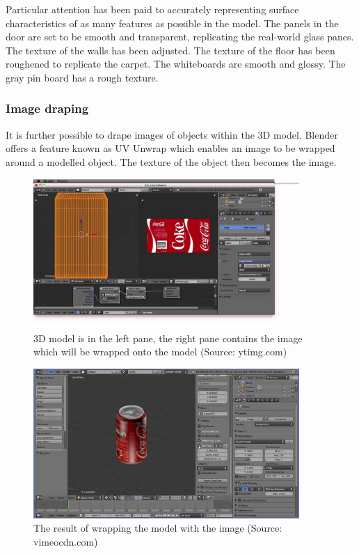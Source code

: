 \documentclass[11pt,a4paper]{report}
\begin{document}
				Particular attention has been paid to accurately representing surface characteristics of as many features as possible in the model.
				The panels in the door are set to be smooth and transparent, replicating the real-world glass panes. 
				The texture of the walls has been adjusted.
				The texture of the floor has been roughened to replicate the carpet.
				The whiteboards are smooth and glossy.
				The gray pin board has a rough texture.
				
			\subsubsection{Image draping}
				It is further possible to drape images of objects within the 3D model. Blender offers a feature known as UV Unwrap which enables an image to be wrapped around a modelled object. The texture of the object then becomes the image.
				\begin{figure}[H]
					\centering
					\includegraphics[width=0.9\textwidth]{blender_uv_unwrap_1}
					\caption{3D model is in the left pane, the right pane contains the image which will be wrapped onto the model (Source: ytimg.com)}
					\label{fig:blender_uv_unwrap_1}
				\end{figure}
				\begin{figure}[H]
					\centering
					\includegraphics[width=0.9\textwidth]{blender_uv_unwrap_2}
					\caption{The result of wrapping the model with the image (Source: vimeocdn.com)}
					\label{fig:blender_uv_unwrap_2}
				\end{figure}
				
\end{document}
